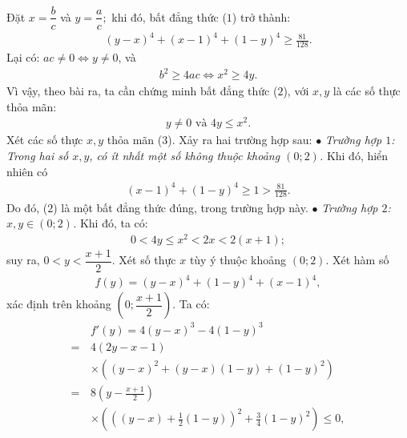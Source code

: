\begin{multicols}{2}
\begin{align*}
	\end{align*}
	Đặt $x = \dfrac{b}{c}$  và $y = \dfrac{a}{c};$ khi đó, bất đẳng thức ($1$) trở thành:
	\begin{align*}
		{\left( {y \!- \!x} \right)^4} \!+\! {\left( {x \!-\! 1} \right)^4} \!+\! {\left( {1 \!-\! y} \right)^4} \!\ge\! \frac{{81}}{{128}}. \tag{$2$}
	\end{align*}
	Lại có: $ac \ne 0 \Leftrightarrow y \ne 0$, và 
	\begin{align*}
		b^2 \ge 4ac \Leftrightarrow x^2 \ge 4y.
	\end{align*}
	Vì vậy, theo bài ra, ta cần chứng minh bất đẳng thức ($2$), với $x, y$ là các số thực thỏa mãn:
	\begin{align*}
		y \ne 0 \text{ và  } 4y \le x^2. \tag{$3$}    
	\end{align*}
	Xét các số thực $x, y$ thỏa mãn ($3$).
	\vskip 0.05cm
	Xảy ra hai trường hợp sau:
	\vskip 0.05cm
	$\bullet$ \textit{Trường hợp $1$: Trong hai số $x, y$, có ít nhất một số không thuộc khoảng $(0; 2)$.}
	\vskip 0.05cm
	Khi đó, hiển nhiên có
	\begin{align*}
		{\left( {x - 1} \right)^4} + {\left( {1 - y} \right)^4} \ge 1 > \frac{{81}}{{128}}.
	\end{align*}
	Do đó, ($2$) là một bất đẳng thức đúng, trong trường hợp này.
	\vskip 0.05cm
	$\bullet$ \textit{Trường hợp $2$:  $x, y \in (0; 2)$.}
	\vskip 0.05cm
	Khi đó, ta có:
	\begin{align*}
		0 < 4y \le {x^2} < 2x < 2\left( {x + 1} \right); \tag{$4$}
	\end{align*}
	suy ra, $0 < y < \dfrac{{x + 1}}{2}.$
	\vskip 0.05cm
	Xét số thực $x$ tùy ý thuộc khoảng $(0; 2)$.
	\vskip 0.05cm
	Xét hàm số
	\begin{align*}
		f\left( y \right) = {\left( {y - x} \right)^4} + {\left( {1 - y} \right)^4} + {\left( {x - 1} \right)^4},
	\end{align*}
	xác định trên khoảng $\left( {0;\dfrac{{x + 1}}{2}} \right).$
	\vskip 0.05cm  
	Ta có:
	\begin{align*}
			&f'\left( y \right) = 4{\left( {y - x} \right)^3} - 4{\left( {1 - y} \right)^3} \\
			= \,&4\left( {2y - x - 1} \right)\\
			&\times\!\!\left( {{{\left( {y - x} \right)}^2} + \left( {y - x} \right)\left( {1 - y} \right) + {{\left( {1 - y} \right)}^2}} \right)\\
			 = \,&8\left( {y - \frac{{x + 1}}{2}} \right)\\
			 &\times\!\!\left(\!\!\!\! {{{\left(\!\! {\left( {y \!-\! x} \right) \!+\! \frac{1}{2}\left( {1 \!-\! y} \right)} \!\!\right)}^2} \!\!+\! \frac{3}{4}{{\left( {1 \!-\! y} \right)}^2}}\! \!\!\right) \!\le\! 0,

\end{align*}
\end{multicols}

